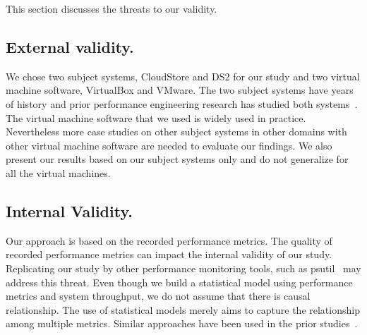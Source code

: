 This section discusses the threats to our validity.

\subsection{External validity.}
We chose two subject systems, CloudStore and DS2 for our study and two virtual machine software, VirtualBox and VMware. The two subject systems have years of history and prior performance engineering research has studied both systems~\cite{jackicsm2009,Nguyen:2012:ADP:2188286.2188344,tarekmsr16}. The virtual machine software that we used is widely used in practice. Nevertheless more case studies on other subject systems in other domains with other virtual machine software are needed to evaluate our findings. We also present our results based on our subject systems only and do not generalize for all the virtual machines.


\subsection{Internal Validity.}
Our approach is based on the recorded performance metrics. The quality of recorded performance metrics can impact the internal validity of our study. Replicating our study by other performance monitoring tools, such as psutil~\cite{psutil} may address this threat. Even though we build a statistical model using performance metrics and system throughput, we do not assume that there is causal relationship. The use of statistical models merely aims to capture the relationship among multiple metrics. Similar approaches have been used in the prior studies~\cite{Cohen:2005:CIC:1095810.1095821, Shang:2015:ADP:2668930.2688052, xiong2013vperfguard}. 



